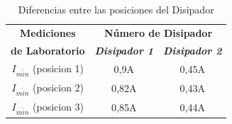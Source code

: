 \documentclass[conference]{IEEEtran}
\begin{document}
    \begin{table}[htbp]
        \caption{Diferencias entre las posiciones del Disipador}
        \begin{center}
        \begin{tabular}{|c|c|c|}
        \hline
        \textbf{Mediciones} & \multicolumn{2}{c|}{\textbf{Número de Disipador}} \\
        \cline{2-3}
        \textbf{de Laboratorio} & \textbf{\textit{Disipador 1}} & \textbf{\textit{Disipador 2}} \\
        \hline
        $I_{m\acute{i}n}$ (posicion 1) & 0,9A & 0,45A \\
        \hline
        $I_{m\acute{i}n}$ (posicion 2) & 0,82A & 0,43A \\
        \hline
        $I_{m\acute{i}n}$ (posicion 3) & 0,85A & 0,44A \\
        \hline
        
        \end{tabular}
        \label{tab1}
        \end{center}
    \end{table}
\end{document}
